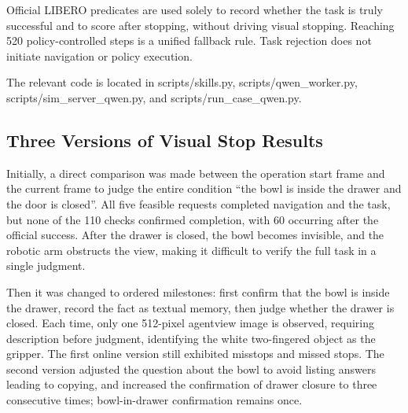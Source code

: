 Official LIBERO predicates are used solely to record whether the task is truly successful and to score after stopping, without driving visual stopping. Reaching 520 policy-controlled steps is a unified fallback rule. Task rejection does not initiate navigation or policy execution.

The relevant code is located in scripts/skills.py, scripts/qwen\_worker.py, scripts/sim\_server\_qwen.py, and scripts/run\_case\_qwen.py.

\subsection{Three Versions of Visual Stop Results}\label{s16-detail-2}

Initially, a direct comparison was made between the operation start frame and the current frame to judge the entire condition ``the bowl is inside the drawer and the door is closed''. All five feasible requests completed navigation and the task, but none of the 110 checks confirmed completion, with 60 occurring after the official success. After the drawer is closed, the bowl becomes invisible, and the robotic arm obstructs the view, making it difficult to verify the full task in a single judgment.

Then it was changed to ordered milestones: first confirm that the bowl is inside the drawer, record the fact as textual memory, then judge whether the drawer is closed. Each time, only one 512-pixel agentview image is observed, requiring description before judgment, identifying the white two-fingered object as the gripper. The first online version still exhibited misstops and missed stops. The second version adjusted the question about the bowl to avoid listing answers leading to copying, and increased the confirmation of drawer closure to three consecutive times; bowl-in-drawer confirmation remains once.

